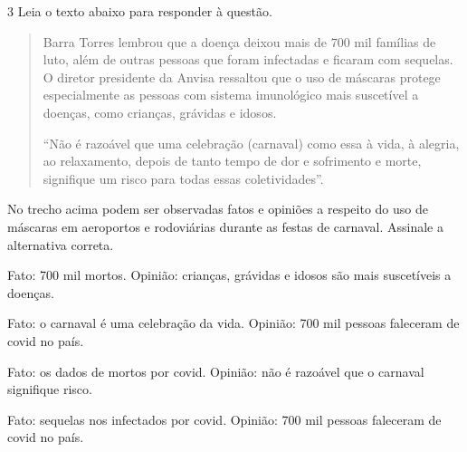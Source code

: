 
\num{3} Leia o texto abaixo para responder à questão.

\begin{quote}

Barra Torres lembrou que a doença deixou mais de 700 mil famílias de
luto, além de outras pessoas que foram infectadas e ficaram com
sequelas. O diretor presidente da Anvisa ressaltou que o uso de máscaras
protege especialmente as pessoas com sistema imunológico mais suscetível
a doenças, como crianças, grávidas e idosos.  

``Não é razoável que uma celebração (carnaval) como essa à vida, à
alegria, ao relaxamento, depois de tanto tempo de dor e sofrimento e
morte, signifique um risco para todas essas coletividades''.

\end{quote}


No trecho acima podem ser observadas fatos e opiniões a respeito do uso
de máscaras em aeroportos e rodoviárias durante as festas de carnaval.
Assinale a alternativa correta.

\begin{escolha}

  \item Fato: 700 mil mortos. Opinião: crianças, grávidas e idosos são mais suscetíveis a doenças.

  \item Fato: o carnaval é uma celebração da vida. Opinião: 700 mil pessoas faleceram de covid no país.
  
  \item Fato: os dados de mortos por covid. Opinião: não é razoável que o carnaval signifique risco.
  
  \item Fato: sequelas nos infectados por covid. Opinião: 700 mil pessoas faleceram de covid no país.

\end{escolha}

